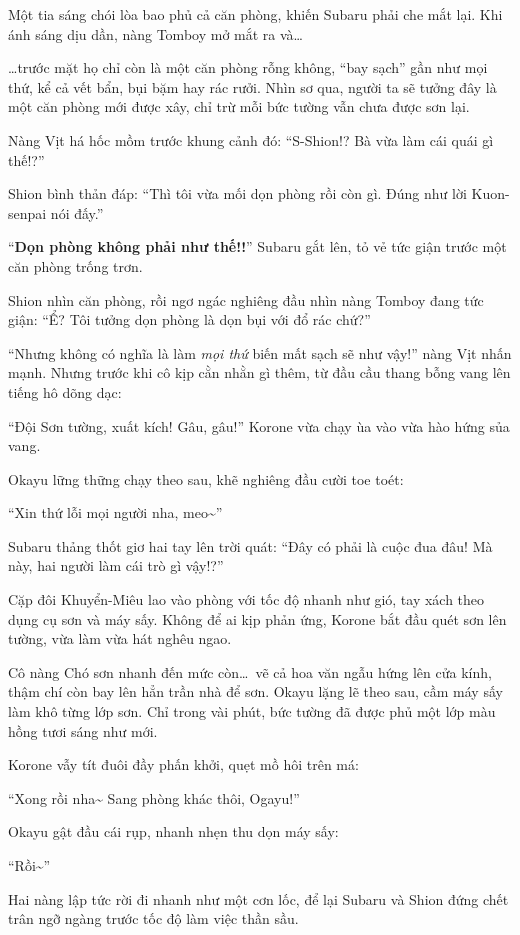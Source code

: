 \documentclass[../main.tex]{subfiles}
\begin{document}
Một tia sáng chói lòa bao phủ cả căn phòng, khiến Subaru phải che mắt lại. Khi ánh sáng dịu dần, nàng Tomboy mở mắt ra và\dots

\dots trước mặt họ chỉ còn là một căn phòng rỗng không, ``bay sạch'' gần như mọi thứ, kể cả vết bẩn, bụi bặm hay rác rưởi. Nhìn sơ qua, người ta sẽ tưởng đây là một căn phòng mới được xây, chỉ trừ mỗi bức tường vẫn chưa được sơn lại.

Nàng Vịt há hốc mồm trước khung cảnh đó: ``S-Shion!? Bà vừa làm cái quái gì thế!?''

Shion bình thản đáp: ``Thì tôi vừa mối dọn phòng rồi còn gì. Đúng như lời Kuon-senpai nói đấy.''

``\textbf{Dọn phòng không phải như thế!!}'' Subaru gắt lên, tỏ vẻ tức giận trước một căn phòng trống trơn.

Shion nhìn căn phòng, rồi ngơ ngác nghiêng đầu nhìn nàng Tomboy đang tức giận: ``Ể? Tôi tưởng dọn phòng là dọn bụi với đổ rác chứ?''

``Nhưng không có nghĩa là làm \emph{mọi thứ} biến mất sạch sẽ như vậy!'' nàng Vịt nhấn mạnh. Nhưng trước khi cô kịp cằn nhằn gì thêm, từ đầu cầu thang bỗng vang lên tiếng hô dõng dạc:

``Đội Sơn tường, xuất kích! Gâu, gâu!'' Korone vừa chạy ùa vào vừa hào hứng sủa vang.

Okayu lững thững chạy theo sau, khẽ nghiêng đầu cười toe toét:

``Xin thứ lỗi mọi người nha, meo\~{}''

Subaru thảng thốt giơ hai tay lên trời quát: ``Đây có phải là cuộc đua đâu! Mà này, hai người làm cái trò gì vậy!?''

Cặp đôi Khuyển-Miêu lao vào phòng với tốc độ nhanh như gió, tay xách theo dụng cụ sơn và máy sấy. Không để ai kịp phản ứng, Korone bắt đầu quét sơn lên tường, vừa làm vừa hát nghêu ngao.

Cô nàng Chó sơn nhanh đến mức còn\dots\ vẽ cả hoa văn ngẫu hứng lên cửa kính, thậm chí còn bay lên hẳn trần nhà để sơn. Okayu lặng lẽ theo sau, cầm máy sấy làm khô từng lớp sơn. Chỉ trong vài phút, bức tường đã được phủ một lớp màu hồng tươi sáng như mới.

Korone vẫy tít đuôi đầy phấn khởi, quẹt mồ hôi trên má:

``Xong rồi nha\~{} Sang phòng khác thôi, Ogayu!''

Okayu gật đầu cái rụp, nhanh nhẹn thu dọn máy sấy:

``Rồi\~{}''

Hai nàng lập tức rời đi nhanh như một cơn lốc, để lại Subaru và Shion đứng chết trân ngỡ ngàng trước tốc độ làm việc thần sầu.
\end{document}
